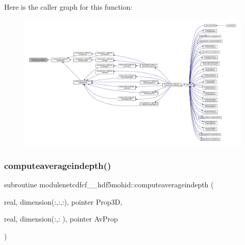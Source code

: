 Here is the caller graph for this function\+:\nopagebreak
\begin{figure}[H]
\begin{center}
\leavevmode
\includegraphics[width=350pt]{namespacemodulenetcdfcf__2__hdf5mohid_ac0196286655bc4a08fbda809ca8d39e9_icgraph}
\end{center}
\end{figure}
\mbox{\label{namespacemodulenetcdfcf__2__hdf5mohid_ad68e046fa00afcf9001262e40ce56492}} 
\subsubsection{\texorpdfstring{computeaverageindepth()}{computeaverageindepth()}}
{\footnotesize\ttfamily subroutine modulenetcdfcf\+\_\+\_\+hdf5mohid\+::computeaverageindepth (\begin{DoxyParamCaption}\item[{real, dimension(\+:,\+:,\+:), pointer}]{Prop3D,  }\item[{real, dimension(\+:,\+:  ), pointer}]{Av\+Prop }\end{DoxyParamCaption})\hspace{0.3cm}{\ttfamily [private]}}

